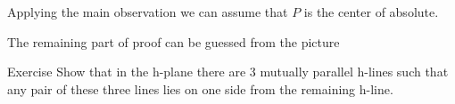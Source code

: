 Applying the main observation we can assume that $P$ is the center of absolute.

The remaining part of proof can be guessed from the picture
\qeds

\begin{thm}{Exercise}\label{ex:3-h-lines}
Show that in the h-plane 
there are 3 mutually parallel h-lines 
such that any pair of these three lines lies on one side from the remaining h-line.
\end{thm}
 


